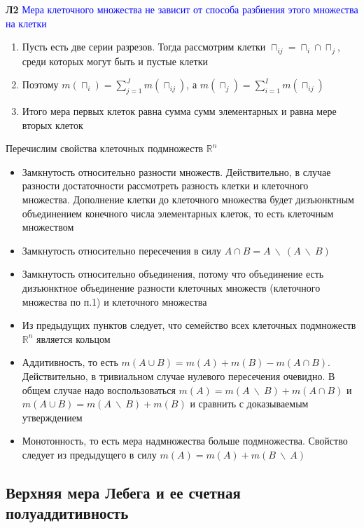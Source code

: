\textbf{Л2} \textcolor{blue}{Мера клеточного множества не зависит от способа разбиения этого множества на клетки}

\begin{enumerate}
    \item Пусть есть две серии разрезов.
    Тогда рассмотрим клетки $\sqcap_{ij} = \sqcap_{i} \cap \sqcap_{j}$, среди которых могут быть и пустые клетки
    \item Поэтому $m(\sqcap_{i}) = \sum_{j = 1}^{J} m(\sqcap_{ij})$, а $m(\sqcap_{j}) = \sum_{i = 1}^{I} m(\sqcap_{ij})$
    \item Итого мера первых клеток равна сумма сумм элементарных и равна мере вторых клеток
\end{enumerate}

Перечислим свойства клеточных подмножеств $\mathbb{R}^n$

\begin{itemize}
    \item Замкнутость относительно разности множеств.
    Действительно, в случае разности достаточности рассмотреть
    разность клетки и клеточного множества.
    Дополнение клетки до клеточного множества будет дизъюнктным
    объединением конечного числа элементарных клеток, то есть клеточным множеством
    \item Замкнутость относительно пересечения в силу $A \cap B = A~\backslash~(A~\backslash~B)$
    \item Замкнутость относительно объединения, потому что объединение есть дизъюнктное объединение разности клеточных множеств (клеточного
    множества по п.1) и клеточного множества
    \item Из предыдущих пунктов следует, что семейство всех клеточных подмножеств $\mathbb{R}^n$ является кольцом
    \item Аддитивность, то есть $m(A \cup B) = m(A) + m(B) - m(A \cap B)$.
    Действительно, в тривиальном случае нулевого пересечения очевидно.
    В общем случае надо воспользоваться $m(A) = m(A~\backslash~B) + m(A \cap B)$ и $m(A \cup B) = m(A~\backslash~B) + m(B)$ и
    сравнить с доказываемым утверждением
    \item Монотонность, то есть мера надмножества больше подмножества.
    Свойство следует из предыдущего в силу $m(A) = m(A) + m(B~\backslash~A)$
\end{itemize}

\subsection{Верхняя мера Лебега и ее счетная полуаддитивность}

